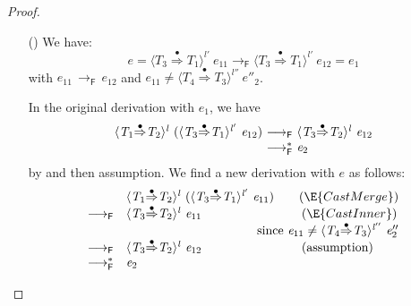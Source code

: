 \documentclass[9pt]{extarticle}
\newcommand{\ottnt}[1]{\mathit{#1}}
\begin{document}
{\begin{lemma}
\begin{proof}
{\begin{itemize}
    \item[(\E{CastInner})] We have:
      \[ \ottnt{e} =  \langle  \ottnt{T_{{\mathrm{3}}}}  \mathord{ \overset{\bullet}{\Rightarrow} }  \ottnt{T_{{\mathrm{1}}}}  \rangle^{ \ottnt{l'} } ~  \ottnt{e_{{\mathrm{11}}}}   \longrightarrow _{  \mathsf{F}  }   \langle  \ottnt{T_{{\mathrm{3}}}}  \mathord{ \overset{\bullet}{\Rightarrow} }  \ottnt{T_{{\mathrm{1}}}}  \rangle^{ \ottnt{l'} } ~  \ottnt{e_{{\mathrm{12}}}}  =
      \ottnt{e_{{\mathrm{1}}}} \] with $\ottnt{e_{{\mathrm{11}}}} \,  \longrightarrow _{  \mathsf{F}  }  \, \ottnt{e_{{\mathrm{12}}}}$ and $\ottnt{e_{{\mathrm{11}}}}  \neq   \langle  \ottnt{T_{{\mathrm{4}}}}  \mathord{ \overset{\bullet}{\Rightarrow} }  \ottnt{T_{{\mathrm{3}}}}  \rangle^{ \ottnt{l''} } ~  \ottnt{e''_{{\mathrm{2}}}} $.

        In the original derivation with $\ottnt{e_{{\mathrm{1}}}}$, we have \[ \begin{array}{r@{~}c@{~}l} 
           \langle  \ottnt{T_{{\mathrm{1}}}}  \mathord{ \overset{\bullet}{\Rightarrow} }  \ottnt{T_{{\mathrm{2}}}}  \rangle^{ \ottnt{l} } ~   (  \langle  \ottnt{T_{{\mathrm{3}}}}  \mathord{ \overset{\bullet}{\Rightarrow} }  \ottnt{T_{{\mathrm{1}}}}  \rangle^{ \ottnt{l'} } ~  \ottnt{e_{{\mathrm{12}}}}  )   & \longrightarrow _{  \mathsf{F}  } &  \langle  \ottnt{T_{{\mathrm{3}}}}  \mathord{ \overset{\bullet}{\Rightarrow} }  \ottnt{T_{{\mathrm{2}}}}  \rangle^{ \ottnt{l} } ~  \ottnt{e_{{\mathrm{12}}}}  \\
          & \longrightarrow ^{*}_{  \mathsf{F}  } & \ottnt{e_{{\mathrm{2}}}} \end{array} \] by
         and then assumption. We find a new derivation with
        $\ottnt{e}$ as follows:
      \[ \begin{array}{rl}
        &  \langle  \ottnt{T_{{\mathrm{1}}}}  \mathord{ \overset{\bullet}{\Rightarrow} }  \ottnt{T_{{\mathrm{2}}}}  \rangle^{ \ottnt{l} } ~   (  \langle  \ottnt{T_{{\mathrm{3}}}}  \mathord{ \overset{\bullet}{\Rightarrow} }  \ottnt{T_{{\mathrm{1}}}}  \rangle^{ \ottnt{l'} } ~  \ottnt{e_{{\mathrm{11}}}}  )   \qquad (\E{CastMerge}) \\
         \longrightarrow _{  \mathsf{F}  } &  \langle  \ottnt{T_{{\mathrm{3}}}}  \mathord{ \overset{\bullet}{\Rightarrow} }  \ottnt{T_{{\mathrm{2}}}}  \rangle^{ \ottnt{l} } ~  \ottnt{e_{{\mathrm{11}}}}  \qquad\qquad\qquad\qquad (\E{CastInner}) \\
        \multicolumn{2}{r}{\text{~since $\ottnt{e_{{\mathrm{11}}}}  \neq   \langle  \ottnt{T_{{\mathrm{4}}}}  \mathord{ \overset{\bullet}{\Rightarrow} }  \ottnt{T_{{\mathrm{3}}}}  \rangle^{ \ottnt{l''} } ~  \ottnt{e''_{{\mathrm{2}}}} $}} \\
         \longrightarrow _{  \mathsf{F}  } &  \langle  \ottnt{T_{{\mathrm{3}}}}  \mathord{ \overset{\bullet}{\Rightarrow} }  \ottnt{T_{{\mathrm{2}}}}  \rangle^{ \ottnt{l} } ~  \ottnt{e_{{\mathrm{12}}}}  \qquad\qquad\qquad\qquad \text{(assumption)} \\
         \longrightarrow ^{*}_{  \mathsf{F}  } & \ottnt{e_{{\mathrm{2}}}} 
      \end{array} \]


\end{itemize}}
\end{proof}
\end{lemma}}
\end{document}
